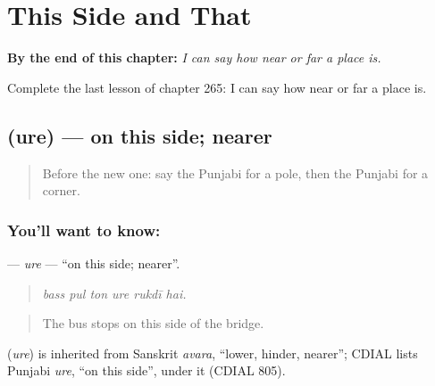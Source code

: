 
\chapter{This Side and That}
\label{ch:pa-a2-this-side-and-that}

\begin{chapteropening}
\textbf{By the end of this chapter:} \emph{I can say how near or far a place is.}

Complete the last lesson of chapter 265: I can say how near or far a place is.
\end{chapteropening}

\section[\texorpdfstring{\pa{ਉਰੇ} (ure)}{ਉਰੇ (ure)}]{ (ure) — on this side; nearer}

\label{lesson:PA-C265-ure}



\begin{quote}
Before the new one: say the Punjabi for a pole, then the Punjabi for a corner.
\end{quote}

\subsection*{You'll want to know: }
\textbf{} — \emph{ure} — \textquotedblleft{}on this side; nearer\textquotedblright{}.

\begin{quote}
     
\end{quote}

\begin{quote}
\emph{bass pul ton ure rukdī hai.}
\end{quote}

\begin{quote}
The bus stops on this side of the bridge.
\end{quote}

\begin{cousinweb}
\textbf{} (\emph{ure}) is inherited from Sanskrit \emph{avara}, \textquotedblleft{}lower, hinder, nearer\textquotedblright{}; CDIAL lists Punjabi \emph{ure}, \textquotedblleft{}on this side\textquotedblright{}, under it (CDIAL 805).
\end{cousinweb}

